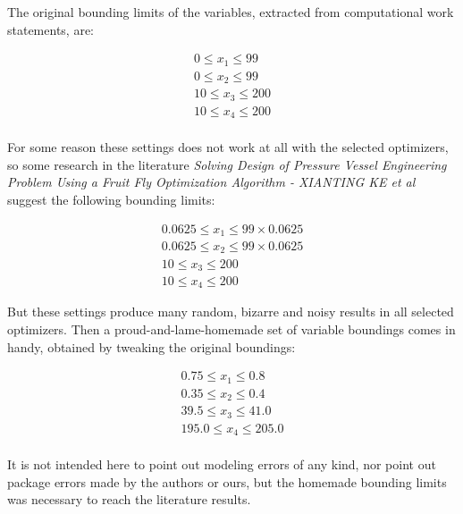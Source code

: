 \documentclass[conference]{IEEEtran}
\begin{document}
The original bounding limits of the variables, extracted from computational work
statements, are:

\begin{equation}
    \begin{split}
        0 \leq x_1 \leq 99\\
        0 \leq x_2 \leq 99\\
        10 \leq x_3 \leq 200\\
        10 \leq x_4 \leq 200\\
    \end{split}
\end{equation}

For some reason these settings does not work at all with the selected optimizers, so
some research in the literature \textit{Solving Design of Pressure Vessel Engineering
Problem Using a Fruit Fly Optimization Algorithm - XIANTING KE et al} suggest the
following bounding limits:

\begin{equation}
    \begin{split}
        0.0625 \leq x_1 \leq 99 \times 0.0625\\
        0.0625 \leq x_2 \leq 99 \times 0.0625\\
        10 \leq x_3 \leq 200\\
        10 \leq x_4 \leq 200
    \end{split}
\end{equation}

But these settings produce many random, bizarre and noisy results in all selected optimizers. Then
a proud-and-lame-homemade set of variable boundings comes in handy, obtained by tweaking the original
boundings:

\begin{equation}
    \begin{split}
        0.75 \leq x_1 \leq 0.8\\
        0.35 \leq x_2 \leq 0.4\\
        39.5 \leq x_3 \leq 41.0\\
        195.0 \leq x_4 \leq 205.0\\
    \end{split}
\end{equation}

It is not intended here to point out modeling errors of any kind, nor point out package
errors made by the authors or ours, but the homemade bounding limits was necessary to
reach the literature results.
\end{document}
